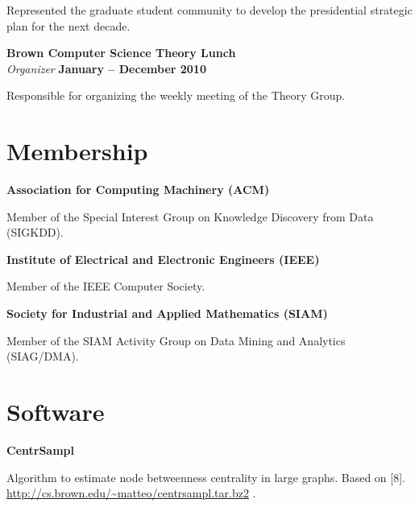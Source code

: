 \documentclass[margin,line]{resume}
\begin{document}
\begin{list2}
\vspace*{.05in}
\item Represented the graduate student community to develop
  the presidential strategic plan for the next decade.
\end{list2}

{\bf Brown Computer Science Theory Lunch}\\
{\em Organizer} \hfill {\bf January -- December 2010 }

\begin{list2}
\vspace*{.05in}
\item Responsible for organizing the weekly meeting of the Theory Group.
\end{list2}

\section{\sc Membership}
{\bf Association for Computing Machinery (ACM)}
\begin{list2}
\vspace*{.05in}
\item Member of the Special Interest Group on Knowledge Discovery from Data (SIGKDD).
\end{list2}
{\bf Institute of Electrical and Electronic Engineers (IEEE)}
\begin{list2}
\vspace*{.05in}
\item Member of the IEEE Computer Society.
\end{list2}
{\bf Society for Industrial and Applied Mathematics (SIAM)}
\begin{list2}
\vspace*{.05in}
\item Member of the SIAM Activity Group on Data Mining and Analytics
  (SIAG/DMA).
\end{list2}

\section{\sc Software}

{\bf CentrSampl}
\begin{list2}
  \vspace*{.05in}
\item Algorithm to estimate node betweenness centrality in large graphs. Based
  on [8]. \\\url{http://cs.brown.edu/~matteo/centrsampl.tar.bz2} .
\end{list2}
\end{document}
